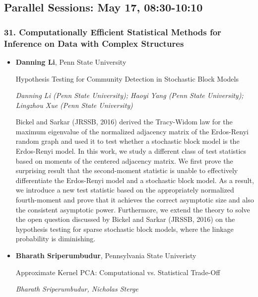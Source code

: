\subsection*{Parallel Sessions: May 17, 08:30-10:10}

\subsubsection*{31. Computationally Efficient Statistical Methods for Inference on Data with Complex Structures}

\begin{itemize}
\item \textbf{Danning Li}, Penn State University

Hypothesis Testing for Community Detection in Stochastic Block Models

\emph{\footnotesize Danning Li (Penn State University); Haoyi Yang (Penn State University); Lingzhou Xue  (Penn State University)}

Bickel and Sarkar (JRSSB, 2016) derived the Tracy-Widom law for the maximum eigenvalue of the normalized adjacency matrix of the Erdos-Renyi random graph and used it to test whether a stochastic block model is the Erdos-Renyi model. In this work, we study a different class of test statistics based on moments of the centered adjacency matrix. We first prove the surprising result that the second-moment statistic is unable to effectively differentiate the Erdos-Renyi model and a stochastic block model. As a result, we introduce a new test statistic based on the appropriately normalized fourth-moment and prove that it achieves the correct asymptotic size and also the consistent asymptotic power. Furthermore, we extend the theory to solve the open question discussed by Bickel and Sarkar (JRSSB, 2016) on the hypothesis testing for sparse stochastic block models, where the linkage probability is diminishing.

\item \textbf{Bharath Sriperumbudur}, Pennsylvania State Univeristy

Approximate Kernel PCA: Computational vs. Statistical Trade-Off

\emph{\footnotesize Bharath Sriperumbudur, Nicholas Sterge}


\end{itemize}
